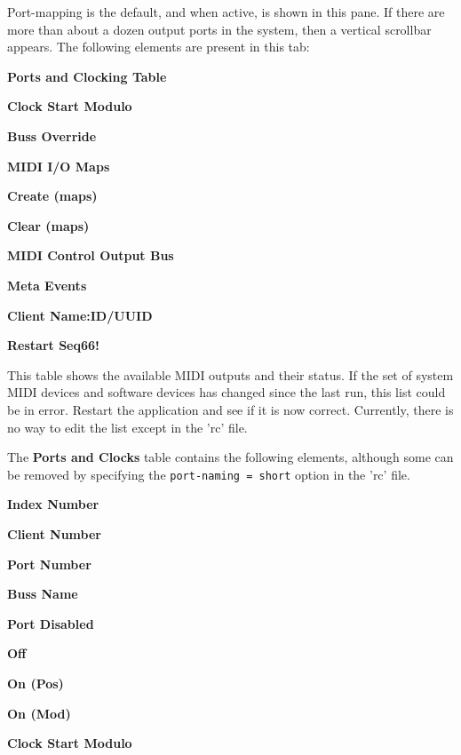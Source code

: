    Port-mapping is the default, and when active, is shown in this pane.
   If there are more than about a dozen
   output ports in the system, then a vertical scrollbar appears.
   The following elements are present in this tab:

   \begin{enumber}
      \item \textbf{Ports and Clocking Table}
      \item \textbf{Clock Start Modulo}
      \item \textbf{Buss Override}
      \item \textbf{MIDI I/O Maps}
      \item \textbf{Create (maps)}
      \item \textbf{Clear (maps)}
      \item \textbf{MIDI Control Output Bus}
      \item \textbf{Meta Events}
      \item \textbf{Client Name:ID/UUID}
      \item \textbf{Restart Seq66!}
   \end{enumber}

   \setcounter{ItemCounter}{0}      %


   This table shows the available MIDI outputs and their status.
   If the set of system MIDI devices and software devices has changed since
   the last run, this list could be in error.  Restart the application
   and see if it is now correct.  Currently, there is no way to edit the list
   except in the 'rc' file.

   The \textbf{Ports and Clocks} table contains the following elements,
   although some can be removed by specifying the
   \texttt{port-naming = short} option in the 'rc' file.

   \begin{enumber}
      \item \textbf{Index Number}
      \item \textbf{Client Number}
      \item \textbf{Port Number}
      \item \textbf{Buss Name}
      \item \textbf{Port Disabled}
      \item \textbf{Off}
      \item \textbf{On (Pos)}
      \item \textbf{On (Mod)}
      \item \textbf{Clock Start Modulo}
   \end{enumber}

